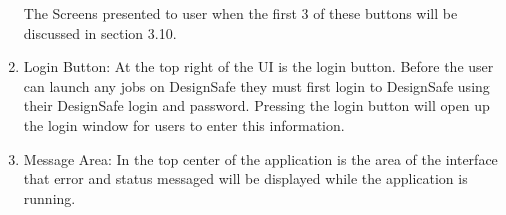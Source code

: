 \begin{enumerate}
The Screens presented to user when the first 3 of these buttons will
be discussed in section 3.10.

\item Login Button: At the top right of the UI is the login
  button. Before the user can launch any jobs on DesignSafe they must
  first login to DesignSafe using their DesignSafe login and
  password. Pressing the login button will open up the login window
  for users to enter this information.

\item Message Area: In the top center of the application is the area
  of the interface that error and status messaged will be displayed
  while the application is running.

\end{enumerate}
